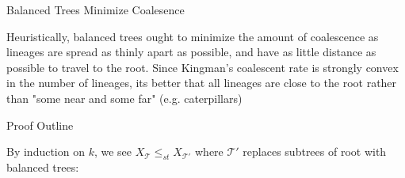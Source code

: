 \documentclass[11pt,aspectratio=169]{beamer}
\begin{document}
\begin{frame}{Balanced Trees Minimize Coalesence}
{    Heuristically, balanced trees ought to minimize the amount of coalescence
    as lineages are spread as thinly apart as possible, and have as little distance as possible to travel to the root. 
    Since Kingman's coalescent rate is strongly convex in the number of lineages, its better that
    all lineages are close to the root rather than "some near and some far" (e.g. caterpillars)

  }
  
\end{frame}



\begin{frame}{Proof Outline}

  By induction on $k$, we see $X_{\mathcal{T}} \leq_{st} X_{\mathcal{T'}}$ where $\mathcal{T'}$ replaces subtrees of root with balanced trees:
  
  \vspace{0.5em}
  \begin{center}
    \begin{minipage}{0.45\linewidth}
      \centering
    \end{minipage}
    \hfill
    \begin{minipage}{0.08\linewidth}
      \centering
    \end{minipage}
    \hfill
    \begin{minipage}{0.45\linewidth}
      \centering
\end{minipage}
\end{center}
\end{frame}
\end{document}
